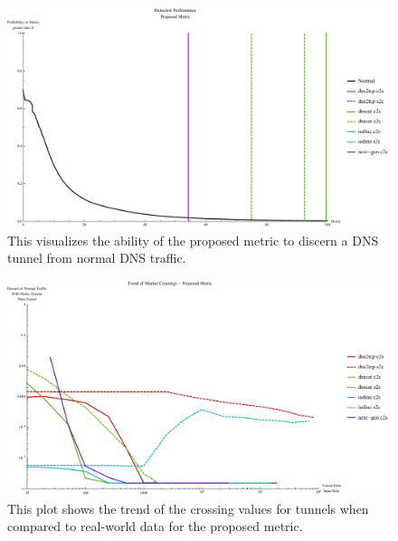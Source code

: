 \documentclass[12pt]{report}
\theoremstyle{remark}
\theoremstyle{definition}
\theoremstyle{definition}
\theoremstyle{definition}
\begin{document}
\begin{figure}
\centering
\includegraphics[width=\textwidth]{figures/mphv-100.pdf}
\caption[Tunnel Detection Performance - Proposed Metric]{This visualizes the
ability of the proposed metric to discern a DNS tunnel from normal DNS traffic.}
\label{mphv}
\end{figure}

\begin{figure}
\centering
\includegraphics[width=\textwidth]{figures/chplot.pdf}
\caption[Trend of Crossing Value for Tunnels - Proposed Metric]{This plot shows
the trend of the crossing values for tunnels when compared to real-world data for
the proposed metric.}
\label{chplot}
\end{figure}
\end{document}
